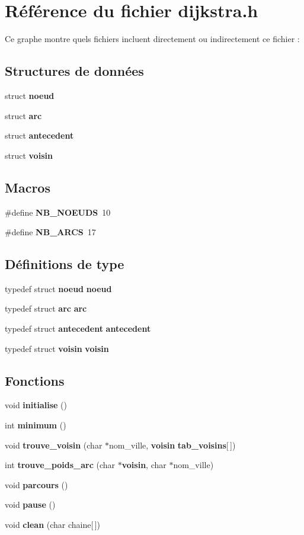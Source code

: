 \section{Référence du fichier dijkstra.\+h}
\label{dijkstra_8h}
Ce graphe montre quels fichiers incluent directement ou indirectement ce fichier \+:
\subsection*{Structures de données}
\begin{DoxyCompactItemize}
\item 
struct {\bf noeud}
\item 
struct {\bf arc}
\item 
struct {\bf antecedent}
\item 
struct {\bf voisin}
\end{DoxyCompactItemize}
\subsection*{Macros}
\begin{DoxyCompactItemize}
\item 
\#define {\bf N\+B\+\_\+\+N\+O\+E\+U\+DS}~10
\item 
\#define {\bf N\+B\+\_\+\+A\+R\+CS}~17
\end{DoxyCompactItemize}
\subsection*{Définitions de type}
\begin{DoxyCompactItemize}
\item 
typedef struct {\bf noeud} {\bf noeud}
\item 
typedef struct {\bf arc} {\bf arc}
\item 
typedef struct {\bf antecedent} {\bf antecedent}
\item 
typedef struct {\bf voisin} {\bf voisin}
\end{DoxyCompactItemize}
\subsection*{Fonctions}
\begin{DoxyCompactItemize}
\item 
void {\bf initialise} ()
\item 
int {\bf minimum} ()
\item 
void {\bf trouve\+\_\+voisin} (char $\ast$nom\+\_\+ville, {\bf voisin} {\bf tab\+\_\+voisins}[$\,$])
\item 
int {\bf trouve\+\_\+poids\+\_\+arc} (char $\ast${\bf voisin}, char $\ast$nom\+\_\+ville)
\item 
void {\bf parcours} ()
\item 
void {\bf pause} ()
\item 
void {\bf clean} (char chaine[$\,$])
\end{DoxyCompactItemize}
